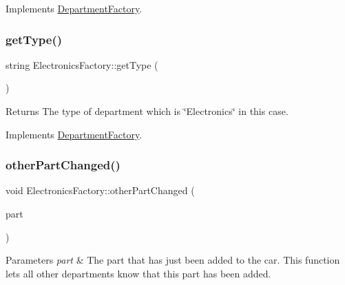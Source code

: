 Implements \hyperlink{classDepartmentFactory_a6080a560efb9fe0b9c870db5a7358886}{Department\+Factory}.

\mbox{\label{classElectronicsFactory_a494fea1f1a55bca20ce1bb4c988d9d44}} 
\subsubsection{\texorpdfstring{get\+Type()}{getType()}}
{\footnotesize\ttfamily string Electronics\+Factory\+::get\+Type (\begin{DoxyParamCaption}{ }\end{DoxyParamCaption})\hspace{0.3cm}{\ttfamily [virtual]}}

\begin{DoxyReturn}{Returns}
The type of department which is \char`\"{}\+Electronics\char`\"{} in this case. 
\end{DoxyReturn}


Implements \hyperlink{classDepartmentFactory_a5aac775b89c4c390ad885e1de8947b0d}{Department\+Factory}.

\mbox{\label{classElectronicsFactory_ae21ff30f4890eab2474fac71d2615941}} 
\subsubsection{\texorpdfstring{other\+Part\+Changed()}{otherPartChanged()}}
{\footnotesize\ttfamily void Electronics\+Factory\+::other\+Part\+Changed (\begin{DoxyParamCaption}\item[{\hyperlink{classDepartmentOutput}{Department\+Output} $\ast$}]{part }\end{DoxyParamCaption})\hspace{0.3cm}{\ttfamily [virtual]}}


\begin{DoxyParams}{Parameters}
{\em part} & The part that has just been added to the car. This function lets all other departments know that this part has been added. \\
\hline
\end{DoxyParams}


